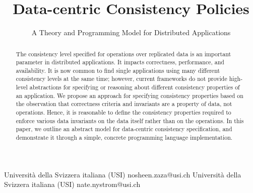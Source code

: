 \documentclass[preprint,numbers]{sigplanconf}
\begin{document}
\setlength{\pdfpageheight}{\paperheight}
\setlength{\pdfpagewidth}{\paperwidth}




\title{Data-centric Consistency Policies}
\subtitle{A Theory and Programming Model for Distributed Applications}

           {Universit\`a della Svizzera italiana (USI)}
           {nosheen.zaza@usi.ch}
           {Universit\`a della Svizzera italiana (USI)}
           {nate.nystrom@usi.ch}

\maketitle

\begin{abstract}
The consistency level specified for operations over replicated data is 
an important parameter in distributed applications. It impacts correctness, 
performance, and availability. It is now common to find single applications
using many different consistency
levels at the same time; however, current frameworks do not
provide high-level abstractions for specifying or reasoning about different consistency properties of an application. 
We propose an approach for specifying consistency properties based on the
observation that
correctness criteria and invariants are a property of data, not operations.
Hence, it is reasonable to define the consistency properties
  required to enforce various data invariants on the data itself rather
  than on the operations. In this paper, we outline an abstract model
for data-centric consistency specification, and demonstrate it through a simple,
concrete programming language implementation.
\end{abstract}


\end{document}
